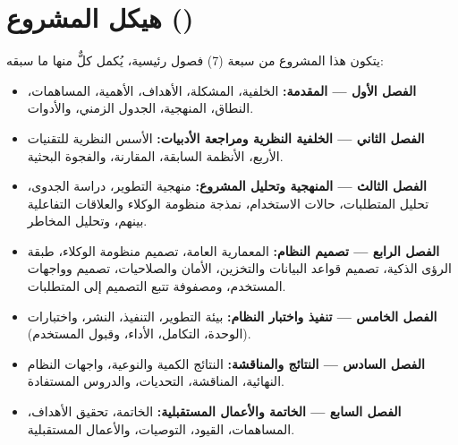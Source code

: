 \section{هيكل المشروع ()}
\label{sec:structure}

يتكون هذا المشروع من سبعة (7) فصول رئيسية، يُكمل كلٌّ منها ما سبقه:

\begin{itemize}
  \item \textbf{الفصل الأول — المقدمة:} الخلفية، المشكلة، الأهداف، الأهمية، المساهمات،
        النطاق، المنهجية، الجدول الزمني، والأدوات.
  \item \textbf{الفصل الثاني — الخلفية النظرية ومراجعة الأدبيات:} الأسس
        النظرية للتقنيات الأربع، الأنظمة السابقة، المقارنة، والفجوة البحثية.
  \item \textbf{الفصل الثالث — المنهجية وتحليل المشروع:} منهجية التطوير، دراسة
        الجدوى، تحليل المتطلبات، حالات
        الاستخدام، نمذجة منظومة الوكلاء والعلاقات التفاعلية بينهم، وتحليل المخاطر.
  \item \textbf{الفصل الرابع — تصميم النظام:} المعمارية العامة، تصميم منظومة
        الوكلاء، طبقة الرؤى الذكية، تصميم قواعد البيانات والتخزين، الأمان
        والصلاحيات، تصميم  وواجهات المستخدم، ومصفوفة تتبع التصميم
        إلى المتطلبات.
  \item \textbf{الفصل الخامس — تنفيذ واختبار النظام:} بيئة التطوير، التنفيذ،
        النشر، واختبارات (الوحدة، التكامل، الأداء، وقبول المستخدم).
  \item \textbf{الفصل السادس — النتائج والمناقشة:} النتائج الكمية والنوعية،
        واجهات النظام النهائية، المناقشة، التحديات، والدروس المستفادة.
  \item \textbf{الفصل السابع — الخاتمة والأعمال المستقبلية:} الخاتمة، تحقيق
        الأهداف، المساهمات، القيود، التوصيات، والأعمال المستقبلية.
\end{itemize}

